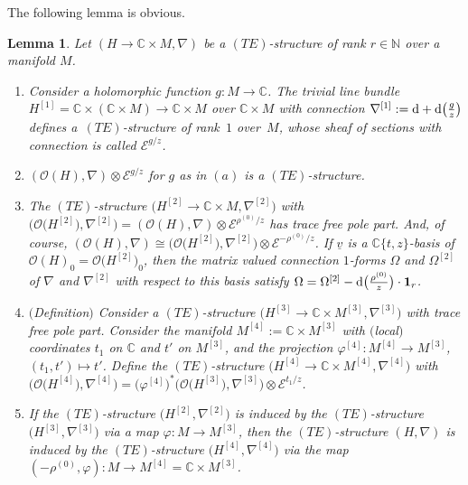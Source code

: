 \documentclass[pdftex]{sigma}%
\numberwithin{equation}{section}
\numberwithin{figure}{section}
\newcommand{\N}{{\mathbb N}}
\newcommand{\C}{{\mathbb C}}
\newcommand{\EE}{{\mathcal E}}
\newcommand{\OO}{{\mathcal O}}
\newcommand{\uuuu}{\underline}
\newcommand{\nnn}{\nabla}
\newtheorem{Lemma}[Theorem]{Lemma}
\begin{document}
The following lemma is obvious.

\begin{Lemma}\label{t3.10}
Let $(H\to\C\times M,\nnn)$ be a $(TE)$-structure
of rank $r\in\N$ over a manifold $M$.

\begin{enumerate}\itemsep=0pt
\item[$(a)$] Consider a holomorphic function $g\colon M\to\C$.
The trivial line bundle $H^{[1]}=\C\times\allowbreak(\C\times M)\to
\C\times M$ over $\C\times M$ with connection
$\nnn^{[1]}:={\rm d}+{\rm d}\big(\frac{g}{z}\big)$ defines a~$(TE)$-structure of rank~$1$ over~$M$, whose sheaf of sections
with connection is called $\EE^{g/z}$.

\item[$(b)$] $(\OO(H),\nnn)\otimes \EE^{g/z}$ for $g$ as in $(a)$
is a $(TE)$-structure.

\item[$(c)$] The $(TE)$-structure $\big(H^{[2]}\to\C\times M,\nnn^{[2]}\big)$ with
$\big(\OO\big(H^{[2]}\big),\nnn^{[2]}\big)=(\OO(H),\nnn)\otimes \EE^{\rho^{(0)}/z}$
has trace free pole part. And, of course,
$(\OO(H),\nnn)\cong \big(\OO\big(H^{[2]}\big),\nnn^{[2]}\big)\otimes\EE^{-\rho^{(0)}/z}$.
If $\uuuu{v}$ is a $\C\{t,z\}$-basis of $\OO(H)_0=\OO\big(H^{[2]}\big)_0$,
then the matrix valued connection $1$-forms $\Omega$ and
$\Omega^{[2]}$ of $\nnn$ and $\nnn^{[2]}$ with respect to this
basis satisfy
$\Omega=\Omega^{[2]}-{\rm d}\big(\frac{\rho^{(0)}}{z}\big)\cdot {\bf 1}_r$.

\item[$(d)$] $($Definition$)$ Consider a $(TE)$-structure
$\big(H^{[3]}\to \C\times M^{[3]},\nnn^{[3]}\big)$ with trace free
pole part. Consider the manifold $M^{[4]}:=\C\times M^{[3]}$
with $($local$)$ coordinates $t_1$ on $\C$ and $t'$ on $M^{[3]}$,
and the projection $\varphi^{[4]}\colon M^{[4]}\to M^{[3]}$,
$(t_1,t')\mapsto t'$.
Define the $(TE)$-structure $\big(H^{[4]}\to \C\times M^{[4]},
\nnn^{[4]}\big)$ with
$\big(\OO\big(H^{[4]}\big),\nnn^{[4]}\big)
=\big(\varphi^{[4]}\big)^*\big(\OO\big(H^{[3]}\big),\nnn^{[3]}\big)\otimes \EE^{t_1/z}$.

\item[$(e)$] If the $(TE)$-structure $\big(H^{[2]},\nnn^{[2]}\big)$ is induced
by the $(TE)$-structure $\big(H^{[3]},\nnn^{[3]}\big)$ via a map
$\varphi\colon M\to M^{[3]}$, then the $(TE)$-structure $(H,\nnn)$
is induced by the $(TE)$-structure $\big(H^{[4]},\nnn^{[4]}\big)$
via the map $(-\rho^{(0)},\varphi)\colon M\to M^{[4]}=\C\times M^{[3]}$.
\end{enumerate}
\end{Lemma}
\end{document}
